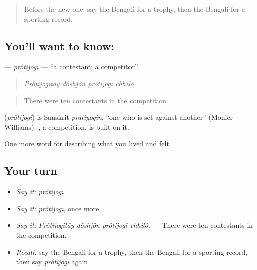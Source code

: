 \label{lesson:BN-C520-protijogi}



\begin{quote}
Before the new one: say the Bengali for a trophy, then the Bengali for a sporting record.
\end{quote}

\subsection*{You'll want to know: }
\textbf{} — \emph{prôtijogī} — \textquotedblleft{}a contestant; a competitor\textquotedblright{}.

\begin{quote}
   
\end{quote}

\begin{quote}
\emph{Prôtijogitāy dôshjôn prôtijogī chhilô.}
\end{quote}

\begin{quote}
There were ten contestants in the competition.
\end{quote}

\begin{cousinweb}
\textbf{} (\emph{prôtijogī}) is Sanskrit \emph{pratiyogin}, \textquotedblleft{}one who is set against another\textquotedblright{} (Monier-Williams); , a competition, is built on it.
\end{cousinweb}

\begin{grammarlens}[title={What you've built}]
One more word for describing what you lived and felt.
\end{grammarlens}

\subsection*{Your turn}
\begin{itemize}
\raggedright
  \item \emph{Say it:} \emph{prôtijogī}
  \item \emph{Say it:} \emph{prôtijogī}, once more
  \item \emph{Say it:} \emph{Prôtijogitāy dôshjôn prôtijogī chhilô.} — There were ten contestants in the competition.
  \item \emph{Recall:} say the Bengali for a trophy, then the Bengali for a sporting record, then say \emph{prôtijogī} again
\end{itemize}

